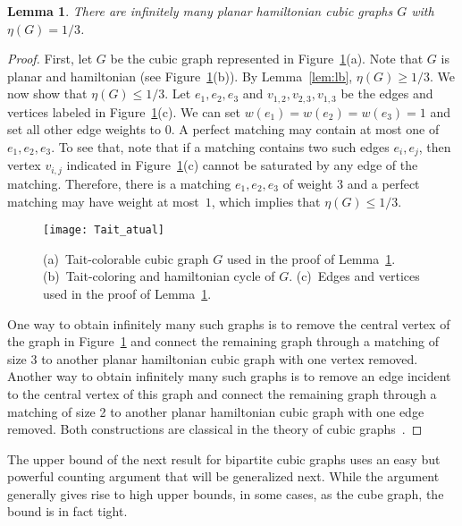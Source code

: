 \documentclass{article}
\newtheorem{lem}[thm]{Lemma}
\begin{document}
\begin{lem} \label{lem:ub}
There are infinitely many planar hamiltonian cubic graphs $G$ with $\eta(G) = 1/3$.
\end{lem}
\begin{proof}
First, let $G$ be the cubic graph represented in Figure~\ref{fig:tait13}(a). 
Note that $G$ is planar and hamiltonian (see Figure~\ref{fig:tait13}(b)). 
By Lemma~\ref{lem:lb}, $\eta(G) \geq 1/3$. We now show that $\eta(G) \leq 1/3$. Let $e_1,e_2,e_3$ and $v_{1,2},v_{2,3},v_{1,3}$ be the edges and vertices labeled in Figure~\ref{fig:tait13}(c). 
We can set $w(e_1)=w(e_2)=w(e_3)=1$ and set all other edge weights to $0$. 
A perfect matching may contain at most one of $e_1,e_2,e_3$. 
To see that, note that if a matching contains two such edges $e_i,e_j$, then vertex $v_{i,j}$ indicated in Figure~\ref{fig:tait13}(c) cannot be saturated by any edge of the matching. 
Therefore, there is a matching $e_1,e_2,e_3$ of weight $3$ and a perfect matching may have weight at most~$1$, which implies that $\eta(G) \leq 1/3$.

\begin{figure}[ht]
\centering
\texttt{[image: Tait\_atual]}
\caption{(a)~Tait-colorable cubic graph $G$ used in the proof of Lemma~\ref{lem:ub}. (b)~Tait-coloring and hamiltonian cycle of $G$. (c)~Edges and vertices used in the proof of Lemma~\ref{lem:ub}.}
\label{fig:tait13}
\end{figure}

One way to obtain infinitely many such graphs is to remove the central vertex of the graph in Figure~\ref{fig:tait13} and connect the remaining graph through a matching of size 3 to another planar hamiltonian cubic graph with one vertex removed. Another way to obtain infinitely many such graphs is to remove an edge incident to the central vertex of this graph and connect the remaining graph through a matching of size 2 to another planar hamiltonian cubic graph with one edge removed. Both constructions are classical in the theory of cubic graphs~\cite{isaacs75}.
\end{proof}

The upper bound of the next result for bipartite cubic graphs uses an easy but powerful counting argument that will be generalized next. While the argument generally gives rise to high upper bounds, in some cases, as the cube graph, the bound is in fact tight.
\end{document}
